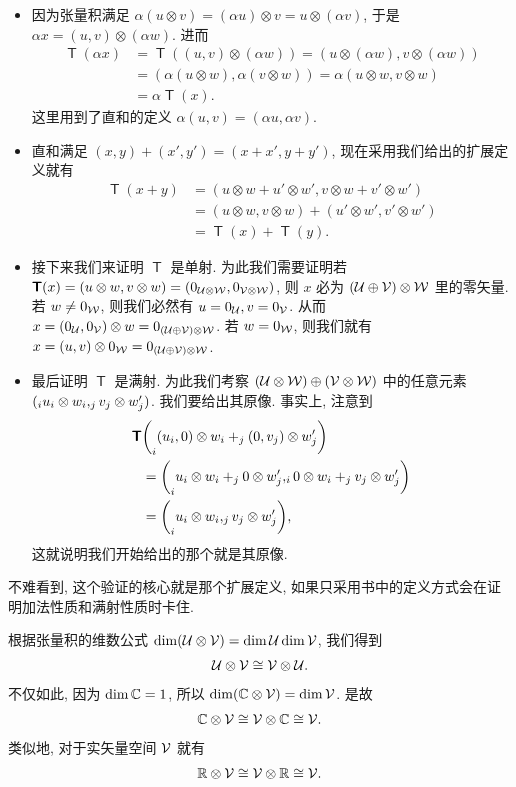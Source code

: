 \documentclass[lang=cn,zihao=-4,twoside,fontset=none]{textbook}
\let\sum\relax
\newcommand{\bsf}[1]{{\mathop{\pmb{\mathsf{#1}}}}}
\def\EQ#1{\begin{equation}\begin{aligned}{}#1\end{aligned}\end{equation}}
\def\eq#1{\[\begin{aligned}{}#1\end{aligned}\]}
\begin{document}
\begin{framed}
{        \begin{itemize}
            \item 因为张量积满足 $\alpha(u\otimes v)=(\alpha u)\otimes v=u\otimes(\alpha v)$, 于是 $\alpha x=(u,v)\otimes(\alpha w)$. 进而 
            \eq{
                \bsf T(\alpha x)&= \bsf T((u,v)\otimes(\alpha w))=(u\otimes(\alpha w),v\otimes(\alpha w))\\
                &=(\alpha(u\otimes w),\alpha(v\otimes w))=\alpha(u\otimes w,v\otimes w)\\
                &=\alpha\bsf{T}(x).
            }
            这里用到了直和的定义 $\alpha(u,v)=(\alpha u,\alpha v)$. 
            \item 直和满足 $(x,y)+(x',y')=(x+x',y+y')$, 现在采用我们给出的扩展定义就有
            \eq{
                \bsf T(x+y)&=(u\otimes w+u'\otimes w',v\otimes w+v'\otimes w')\\
                &=(u\otimes w,v\otimes w)+(u'\otimes w',v'\otimes w')\\
                &=\bsf{T}(x)+\bsf{T}(y).
            }
            \item 接下来我们来证明 $\bsf{T}$ 是单射. 为此我们需要证明若 $\bsf{T}(x)=(u\otimes w,v\otimes w)=(0_{\mU\otimes\mW},0_{\mV\otimes\mW})$, 则 $x$ 必为 $({\mathcal U}\oplus{\mathcal V})\otimes{\mathcal W}$ 里的零矢量. 若 $w\neq 0_{{\mathcal W}}$, 则我们必然有 $u=0_{{\mathcal U}},v=0_{{\mathcal V}}$. 从而 $x=(0_{{\mathcal U}},0_{{\mathcal V}})\otimes w=0_{({\mathcal U}\oplus{\mathcal V})\otimes{\mathcal W}}$. 若 $w=0_{{\mathcal W}}$, 则我们就有 $x=(u,v)\otimes 0_{{\mathcal W}}=0_{({\mathcal U}\oplus{\mathcal V})\otimes{\mathcal W}}$. 
            \item 最后证明 $\bsf{T}$ 是满射. 为此我们考察 $({\mathcal U}\otimes{\mathcal W})\oplus({\mathcal V}\otimes{\mathcal W})$ 中的任意元素 $(\sum_iu_i\otimes w_i,\sum_jv_j\otimes w_j')$. 我们要给出其原像. 事实上, 注意到 
            \eq{
                \bsf{T}&\bigg(\sum_i (u_i,0)\otimes w_i+\sum_j(0,v_j)\otimes w_j'\bigg)\\
                &=\bigg(\sum_i u_i\otimes w_i+\sum_j0\otimes w_j',\sum_i0\otimes w_i+\sum_j v_j\otimes w_j'\bigg)\\
                &=\bigg(\sum_i u_i\otimes w_i,\sum_j v_j\otimes w_j'\bigg),
            }
            这就说明我们开始给出的那个就是其原像. 
        \end{itemize}
        不难看到, 这个验证的核心就是那个扩展定义, 如果只采用书中的定义方式会在证明加法性质和满射性质时卡住.
    }
\end{framed}

根据张量积的维数公式 $\dim({\mathcal U}\otimes{\mathcal V})=\dim{\mathcal U}\dim{\mathcal V}$, 我们得到 
\EQ{
    \mU\otimes\mV\cong\mV\otimes\mU. \label{eq:2.17}
}
不仅如此, 因为 $\dim{\mathbb C}=1$, 所以 $\dim({\mathbb C}\otimes{\mathcal V})=\dim{\mathcal V}$. 是故 
\EQ{
    \bC\otimes\mV\cong\mV\otimes\bC\cong\mV. \label{eq:2.18}
}
类似地, 对于实矢量空间 ${\mathcal V}$ 就有 
\EQ{
    \bR\otimes\mV\cong\mV\otimes\bR\cong\mV. \label{eq:2.19}
}
\end{document}
